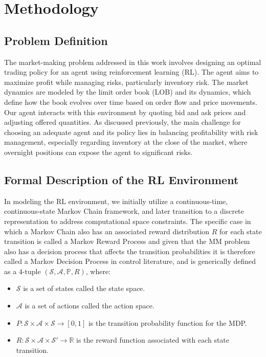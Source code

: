 \section{Methodology}
\label{sec:methodology}

\subsection{Problem Definition}
\label{subsec:problem-definition}
The market-making problem addressed in this work involves designing an optimal trading policy for an agent using reinforcement learning (RL). The agent aims to maximize profit while managing risks, particularly inventory risk. The market dynamics are modeled by the limit order book (LOB) and its dynamics, which define how the book evolves over time based on order flow and price movements. Our agent interacts with this environment by quoting bid and ask prices and adjusting offered quantities. As discussed previously, the main challenge for choosing an adequate agent and its policy lies in balancing profitability with risk management, especially regarding inventory at the close of the market, where overnight positions can expose the agent to significant risks.

\subsection{Formal Description of the RL Environment}
\label{subsec:formal-description-of-the-rl-environment}
In modeling the RL environment, we initially utilize a continuous-time, continuous-state Markov Chain framework, and later transition to a discrete representation to address computational space constraints.
The specific case in which a Markov Chain also has an associated reward distribution $R$ for each state transition is called a Markov Reward Process and given that the MM problem also has a decision process that affects the transition probabilities it is therefore called a Markov Decision Process in control literature, and is generically defined as a 4-tuple $ (\mathcal{S}, \mathcal{A}, \mathbb{P}, R) $, where:

\begin{itemize}
    \item $\mathcal{S}$ is a set of states called the state space.
    \item $\mathcal{A}$ is a set of actions called the action space.
    \item $P: \mathcal{S} \times \mathcal{A} \times \mathcal{S} \to [0, 1]$ is the transition probability function for the MDP.
    \item $R: \mathcal{S} \times \mathcal{A} \times \mathcal{S}' \rightarrow \mathbb{R}$ is the reward function associated with each state transition.
\end{itemize}

